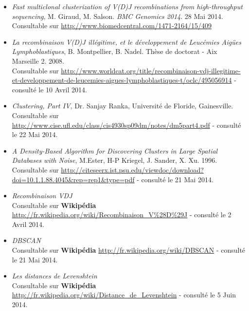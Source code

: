 \documentclass[pdftex,12pt,a4paper]{report}
\begin{document}
\begin{spacing}{1.2}

\begin{itemize}
\item{\textit{Fast multiclonal clusterization of V(D)J recombinations from high-throughput sequencing}, M. Giraud, M. Salson. \textit{BMC Genomics 2014}. 28 Mai 2014.
\\Consultable sur \url{http://www.biomedcentral.com/1471-2164/15/409}}
\\
\item{\textit{La recombinaison V(D)J illégitime, et le développement de Leucémies Aigües Lymphoblastiques}, B. Montpellier, B. Nadel. Thèse de doctorat - Aix Marseille 2. 2008.
\\ Consultable sur \url{http://www.worldcat.org/title/recombinaison-vdj-illegitime-et-developpement-de-leucemies-aigues-lymphoblastiques-t/oclc/495056914} - consulté le 10 Avril 2014.}
\\
\item{\textit{Clustering, Part IV}, Dr. Sanjay Ranka, Université de Floride, Gainesville. \\ Consultable sur \url{http://www.cise.ufl.edu/class/cis4930sp09dm/notes/dm5part4.pdf} - consulté le 22 Mai 2014.}
\\
\item{\textit{A Density-Based Algorithm for Discovering Clusters in Large Spatial Databases with Noise}, M.Ester, H-P Kriegel, J. Sander, X. Xu. 1996. \\ Consultable sur \url{http://citeseerx.ist.psu.edu/viewdoc/download?doi=10.1.1.88.4045&rep=rep1&type=pdf} - consulté le 21 Mai 2014.}
\\
\item{\textit{Recombinaison VDJ}
\\ Consultable sur \textbf{Wikipédia} \url{http://fr.wikipedia.org/wiki/Recombinaison_V%28D%29J} - consulté le 2 Avril 2014.}
\\
\item{\textit{DBSCAN}
\\ Consultable sur \textbf{Wikipédia} \url{http://fr.wikipedia.org/wiki/DBSCAN} - consulté le 21 Mai 2014.}
\\
\item{\textit{Les distances de Levenshtein}
\\ Consultable sur \textbf{Wikipédia} \url{http://fr.wikipedia.org/wiki/Distance_de_Levenshtein} - consulté le 5 Juin 2014.}
\end{itemize}

\end{spacing}
\end{document}
